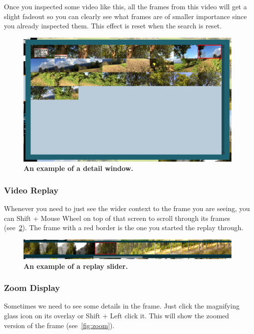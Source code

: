 Once you inspected some video like this, all the frames from this video will get a slight fadeout so you can clearly see what frames are of smaller importance since you already inspected them. This effect is reset when the search is reset.

\begin{figure}[h]
	\centering
	\includegraphics[width=1.0\textwidth]{img/detail-window.png}
  \caption{\textbf{An example of a detail window.}}
	\label{fig:detail-window}
\end{figure}

\subsubsection{Video Replay}
Whenever you need to just see the wider context to the frame you are seeing, you can Shift + Mouse Wheel on top of that screen to scroll through its frames (see~\cref{fig:replay-overlay}). The frame with a red border is the one you started the replay through.

\begin{figure}[h]
	\centering
	\includegraphics[width=1.0\textwidth]{img/replay-overlay.png}
  \caption{\textbf{An example of a replay slider.}}
	\label{fig:replay-overlay}
\end{figure}

\subsubsection{Zoom Display}
Sometimes we need to see some details in the frame. Just click the magnifying glass icon on its overlay or Shift + Left click it. This will show the zoomed version of the frame (see~\cref{fig:zoom}).

